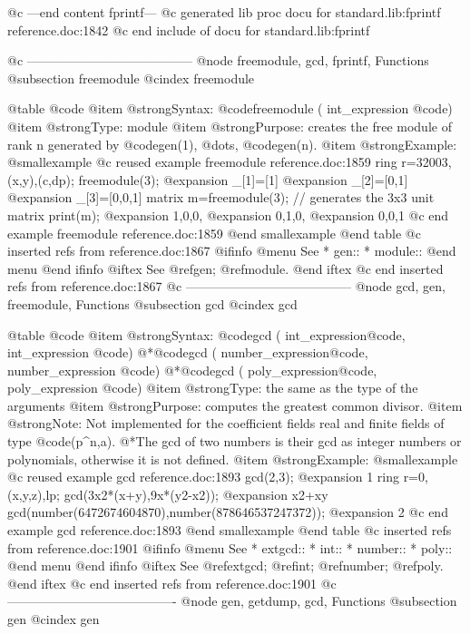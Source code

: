 {@c ---end content fprintf---
@c generated lib proc docu for standard.lib:fprintf reference.doc:1842 
@c end include of docu for standard.lib:fprintf

@c ---------------------------------------
@node freemodule, gcd, fprintf, Functions
@subsection freemodule
@cindex freemodule

@table @code
@item @strong{Syntax:}
@code{freemodule (} int_expression @code{)}
@item @strong{Type:}
module
@item @strong{Purpose:}
creates the free module of rank n generated by
@code{gen(1)}, @dots{}, @code{gen(n)}.
@item @strong{Example:}
@smallexample
@c reused example freemodule reference.doc:1859 
  ring r=32003,(x,y),(c,dp);
  freemodule(3);
@expansion{} _[1]=[1]
@expansion{} _[2]=[0,1]
@expansion{} _[3]=[0,0,1]
  matrix m=freemodule(3); // generates the 3x3 unit matrix
  print(m);
@expansion{} 1,0,0,
@expansion{} 0,1,0,
@expansion{} 0,0,1 
@c end example freemodule reference.doc:1859
@end smallexample
@end table
@c inserted refs from reference.doc:1867
@ifinfo
@menu
See
* gen::
* module::
@end menu
@end ifinfo
@iftex
See
@ref{gen};
@ref{module}.
@end iftex
@c end inserted refs from reference.doc:1867
@c ---------------------------------------
@node gcd, gen, freemodule, Functions
@subsection gcd
@cindex gcd

@table @code
@item @strong{Syntax:}
@code{gcd (} int_expression@code{,} int_expression @code{)}
@*@code{gcd (} number_expression@code{,} number_expression @code{)}
@*@code{gcd (} poly_expression@code{,} poly_expression @code{)}
@item @strong{Type:}
the same as the type of the arguments
@item @strong{Purpose:}
computes the greatest common divisor.
@item @strong{Note:}
Not implemented for the coefficient fields real and finite fields of
type @code{(p^n,a)}.
@*The gcd of two numbers is their gcd as integer numbers or polynomials,
otherwise it is not defined.
@item @strong{Example:}
@smallexample
@c reused example gcd reference.doc:1893 
  gcd(2,3);
@expansion{} 1
  ring r=0,(x,y,z),lp;
  gcd(3x2*(x+y),9x*(y2-x2));
@expansion{} x2+xy
  gcd(number(6472674604870),number(878646537247372));
@expansion{} 2
@c end example gcd reference.doc:1893
@end smallexample
@end table
@c inserted refs from reference.doc:1901
@ifinfo
@menu
See
* extgcd::
* int::
* number::
* poly::
@end menu
@end ifinfo
@iftex
See
@ref{extgcd};
@ref{int};
@ref{number};
@ref{poly}.
@end iftex
@c end inserted refs from reference.doc:1901
@c ----------------------------------------
@node gen, getdump, gcd, Functions
@subsection gen
@cindex gen

}
